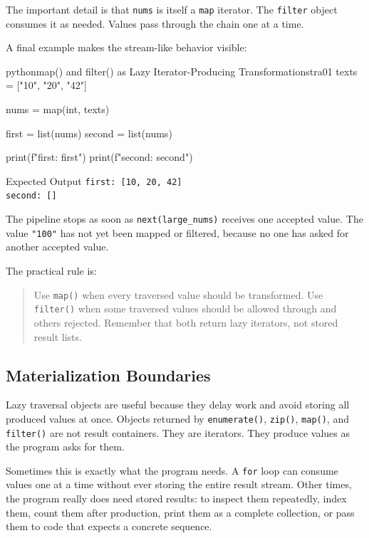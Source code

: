 \documentclass[a4paper,twoside]{report}
\begin{document}
The important detail is that \texttt{nums} is itself a \texttt{map} iterator. The \texttt{filter} object consumes it as needed. Values pass through the chain one at a time.

A final example makes the stream-like behavior visible:

\begin{codebox}[]{python}{map() and filter() as Lazy Iterator-Producing Transformations}{tra01}
texts = ["10", "20", "42"]

nums = map(int, texts)

first = list(nums)
second = list(nums)

print(f"first: {first}")
print(f"second: {second}")
\end{codebox}


\begin{iobox}{Expected Output}
\texttt{first: [10, 20, 42]} \\
\texttt{second: []} \\
\end{iobox}




The pipeline stops as soon as \texttt{next(large\_nums)} receives one accepted value. The value \texttt{"100"} has not yet been mapped or filtered, because no one has asked for another accepted value.

The practical rule is:

\begin{quote}
Use \texttt{map()} when every traversed value should be transformed. Use \texttt{filter()} when some traversed values should be allowed through and others rejected. Remember that both return lazy iterators, not stored result lists.
\end{quote}

\subsection{Materialization Boundaries}

Lazy traversal objects are useful because they delay work and avoid storing all produced values at once. Objects returned by \texttt{enumerate()}, \texttt{zip()}, \texttt{map()}, and \texttt{filter()} are not result containers. They are iterators. They produce values as the program asks for them.

Sometimes this is exactly what the program needs. A \texttt{for} loop can consume values one at a time without ever storing the entire result stream. Other times, the program really does need stored results: to inspect them repeatedly, index them, count them after production, print them as a complete collection, or pass them to code that expects a concrete sequence.
\end{document}
